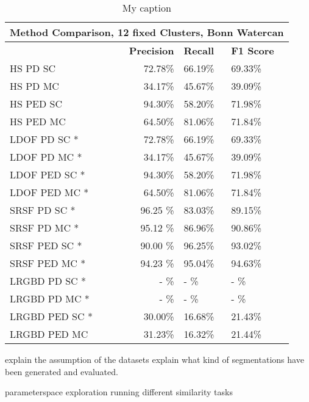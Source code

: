 \begin{table}[]
\centering
\begin{tabular}{|l|r|l|l|}
\hline
\multicolumn{4}{|c|}{Method Comparison, 12 fixed Clusters, Bonn Watercan}                        \\ \hline
              & \textbf{Precision} & \textbf{Recall} & \textbf{F1 Score} \\ \hline
HS PD SC  & 72.78\%   & 66.19\%     & 69.33\%  \\ \hline
HS PD MC  & 34.17\%   & 45.67\%     & 39.09\%  \\ \hline              
HS PED SC  & 94.30\%   & 58.20\%     & 71.98\%  \\ \hline
HS PED MC  & 64.50\%   & 81.06\%     & 71.84\%  \\ \hline            
LDOF PD SC *  & 72.78\%   & 66.19\%     & 69.33\%  \\ \hline
LDOF PD MC *  & 34.17\%   & 45.67\%     & 39.09\%  \\ \hline              
LDOF PED SC *  & 94.30\%   & 58.20\%     & 71.98\%  \\ \hline
LDOF PED MC *  & 64.50\%   & 81.06\%     & 71.84\%  \\ \hline
SRSF PD SC  * & 96.25 \%   & 83.03\%     & 89.15\%  \\ \hline
SRSF PD MC  * & 95.12 \%   & 86.96\%     & 90.86\%  \\ \hline
SRSF PED SC  * & 90.00 \%   & 96.25\%     & 93.02\%  \\ \hline
SRSF PED MC  * & 94.23 \%   & 95.04\%     & 94.63\%  \\ \hline
LRGBD PD SC *  & - \%   & - \%     & - \%  \\ \hline
LRGBD PD MC * & - \%   & - \%     & - \%  \\ \hline
LRGBD PED SC *  & 30.00\%   & 16.68\%     & 21.43\%  \\ \hline
LRGBD PED MC  & 31.23\%   & 16.32\%     & 21.44\%  \\ \hline
\end{tabular}
\caption[Method Comparission Bonn Watercan]{My caption}
\label{tab:bonn_wc_methods}
\end{table}



explain the assumption of the datasets
explain what kind of segmentations have been generated and evaluated.







parameterspace exploration
running different similarity tasks








